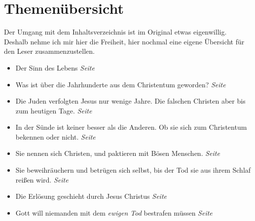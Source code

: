 \chapter{Themenübersicht} \label{ref:theme_nuebersicht}


Der Umgang mit dem Inhaltsverzeichnis ist im Original etwas eigenwillig. Deshalb
nehme ich mir hier die Freiheit, hier nochmal eine eigene Übersicht für den
Leser zusammenzustellen.


\begin{itemize}
 \item Der Sinn des Lebens
 \dotfill \textit{Seite~\pageref{ref:vorw_sinndes_lebens}}\\

 \item Was ist über die Jahrhunderte aus dem Christentum geworden?
 \dotfill \textit{Seite~\pageref{ref:01_02_urchristentum}}\\

 \item Die Juden verfolgten Jesus nur wenige Jahre. Die falschen Christen aber
bis zum heutigen Tage.
 \dotfill \textit{Seite~\pageref{ref:01_04_zweite_kreuzigung}}\\

 \item In der Sünde ist keiner besser als die Anderen. Ob sie sich zum
Christentum bekennen oder nicht.
 \dotfill \textit{Seite~\pageref{ref:01_05_in_suende_gleich}}\\

 \item Sie nennen sich Christen, und paktieren mit Bösen Menschen.
 \dotfill \textit{Seite~\pageref{ref:01_05_in_suende_verbinden}}\\

 \item Sie beweihräuchern und betrügen sich selbst, bis der Tod sie aus ihrem
Schlaf reißen wird.
 \dotfill \textit{Seite~\pageref{ref:01_07_selbstbetrug}}\\

 \item Die Erlösung geschieht durch Jesus Christus
 \dotfill \textit{Seite~\pageref{ref:01_10_jesus_der_erloeser}}\\

 \item Gott will niemanden mit dem \textit{ewigen Tod} bestrafen müssen
 \dotfill \textit{Seite~\pageref{ref:02_02_kein_gefallen_am_tod}}\\


\end{itemize}
